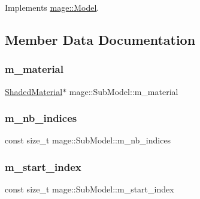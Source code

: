 Implements \hyperlink{classmage_1_1_model_a7879cd7c98cefbaf325ee71832275265}{mage\+::\+Model}.



\subsection{Member Data Documentation}
\hypertarget{classmage_1_1_sub_model_ac32eea7a1db56906ebf63b8683231999}{}\label{classmage_1_1_sub_model_ac32eea7a1db56906ebf63b8683231999} 
\subsubsection{\texorpdfstring{m\+\_\+material}{m\_material}}
{\footnotesize\ttfamily \hyperlink{structmage_1_1_shaded_material}{Shaded\+Material}$\ast$ mage\+::\+Sub\+Model\+::m\+\_\+material\hspace{0.3cm}{\ttfamily [private]}}

\hypertarget{classmage_1_1_sub_model_a0471b8b0c4b7be0e696378238b25e7e7}{}\label{classmage_1_1_sub_model_a0471b8b0c4b7be0e696378238b25e7e7} 
\subsubsection{\texorpdfstring{m\+\_\+nb\+\_\+indices}{m\_nb\_indices}}
{\footnotesize\ttfamily const size\+\_\+t mage\+::\+Sub\+Model\+::m\+\_\+nb\+\_\+indices\hspace{0.3cm}{\ttfamily [private]}}

\hypertarget{classmage_1_1_sub_model_a22db3ac71a33ed64a26bb2e4410eeb28}{}\label{classmage_1_1_sub_model_a22db3ac71a33ed64a26bb2e4410eeb28} 
\subsubsection{\texorpdfstring{m\+\_\+start\+\_\+index}{m\_start\_index}}
{\footnotesize\ttfamily const size\+\_\+t mage\+::\+Sub\+Model\+::m\+\_\+start\+\_\+index\hspace{0.3cm}{\ttfamily [private]}}

